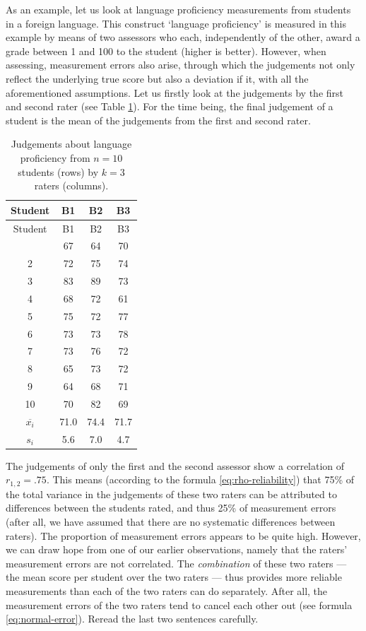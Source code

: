 \documentclass[
]{book}
\begin{document}
As an example, let us look at language proficiency measurements from students
in a foreign language. This construct `language proficiency'
is measured in this example by means of two assessors who each, independently
of the other, award a grade between 1 and 100 to the student (higher is better).
However, when assessing, measurement errors also arise, through which the judgements
not only reflect the underlying true score but also a deviation if it, with
all the aforementioned assumptions. Let us firstly look at the
judgements by the first and second rater (see Table
\ref{tab:reliability}). For the time being, the final judgement of a student is
the mean of the judgements from the first and second rater.

\begin{longtable}[]{@{}cccc@{}}
\caption{\label{tab:reliability} Judgements about language proficiency
from \(n = 10\) students (rows) by \(k = 3\) raters (columns).}\tabularnewline
\toprule\noalign{}
Student & B1 & B2 & B3 \\
\midrule\noalign{}
\endfirsthead
\toprule\noalign{}
Student & B1 & B2 & B3 \\
\midrule\noalign{}
\endhead
\bottomrule\noalign{}
\endlastfoot
1 & 67 & 64 & 70 \\
2 & 72 & 75 & 74 \\
3 & 83 & 89 & 73 \\
4 & 68 & 72 & 61 \\
5 & 75 & 72 & 77 \\
6 & 73 & 73 & 78 \\
7 & 73 & 76 & 72 \\
8 & 65 & 73 & 72 \\
9 & 64 & 68 & 71 \\
10 & 70 & 82 & 69 \\
\(\overline{x_i}\) & 71.0 & 74.4 & 71.7 \\
\(s_i\) & 5.6 & 7.0 & 4.7 \\
\end{longtable}

The judgements of only the first and the second assessor show a
correlation of \(r_{1,2}=.75\). This means (according to the formula
\eqref{eq:rho-reliability}) that 75\% of the total variance in the
judgements of these two raters can be attributed to differences
between the students rated, and thus 25\% of measurement errors (after all,
we have assumed that there are no systematic differences between
raters). The proportion of measurement errors appears to be quite high.
However, we can draw hope from one of our earlier observations, namely that
the raters' measurement errors are not correlated. The
\emph{combination} of these two raters --- the mean score per student
over the two raters --- thus provides more reliable measurements
than each of the two raters can do separately. After all, the
measurement errors of the two raters tend to cancel each other out
(see formula \eqref{eq:normal-error}).
Reread the last two sentences carefully.
\end{document}
